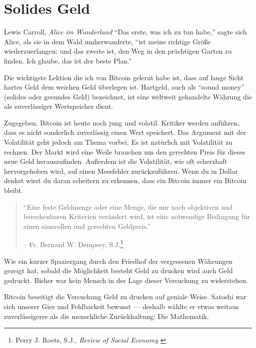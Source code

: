 \chapter{Solides Geld}
\label{les:14}

\begin{chapquote}{Lewis Carroll, \textit{Alice im Wunderland}}
\enquote{Das erste, was ich zu tun habe,} sagte sich Alice, als sie in dem Wald
umherwanderte, \enquote{ist meine richtige Größe wiederzuerlangen; und das
zweite ist, den Weg in den prächtigen Garten zu finden. Ich glaube, das ist der
beste Plan.}
\end{chapquote}

Die wichtigste Lektion die ich von Bitcoin gelernt habe ist, dass auf lange
Sicht hartes Geld dem weichen Geld überlegen ist. Hartgeld, auch als
\enquote{sound money} (solides oder gesundes Geld) bezeichnet, ist eine weltweit
gehandelte Währung die als zuverlässiger Wertspeicher dient.

Zugegeben, Bitcoin ist heute noch jung und volatil. Kritiker werden anführen,
dass es nicht sonderlich zuverlässig einen Wert speichert. Das Argument mit der
Volatilität geht jedoch am Thema vorbei. Es ist natürlich mit Volatilität zu
rechnen. Der Markt wird eine Weile brauchen um den gerechten Preis für dieses
neue Geld herauszufinden. Außerdem ist die Volatilität, wie oft scherzhaft
hervorgehoben wird, auf einen Messfehler zurückzuführen. Wenn du in Dollar
denkst wirst du daran scheitern zu erkennen, dass ein Bitcoin immer ein Bitcoin
bleibt.

\begin{quotation}\begin{samepage}
\enquote{Eine feste Geldmenge oder eine Menge, die nur nach objektiven und
berechenbaren Kriterien verändert wird, ist eine notwendige Bedingung für einen
sinnvollen und gerechten Geldpreis.}
\begin{flushright} -- Fr. Bernard W. Dempsey, S.J.\footnote{Perry J. Roets, S.J., \textit{Review of Social Economy} \cite{review-social-economy}}
\end{flushright}\end{samepage}\end{quotation}

Wie ein kurzer Spaziergang durch den Friedhof der vergessenen Währungen gezeigt
hat, sobald die Möglichkeit besteht Geld zu drucken wird auch Geld gedruckt.
Bisher war kein Mensch in der Lage dieser Versuchung zu widerstehen.

Bitcoin beseitigt die Versuchung Geld zu drucken auf geniale Weise. Satoshi war
sich unserer Gier und Fehlbarkeit bewusst --- deshalb wählte er etwas weitaus
zuverlässigeres als die menschliche Zurückhaltung: Die Mathematik.

